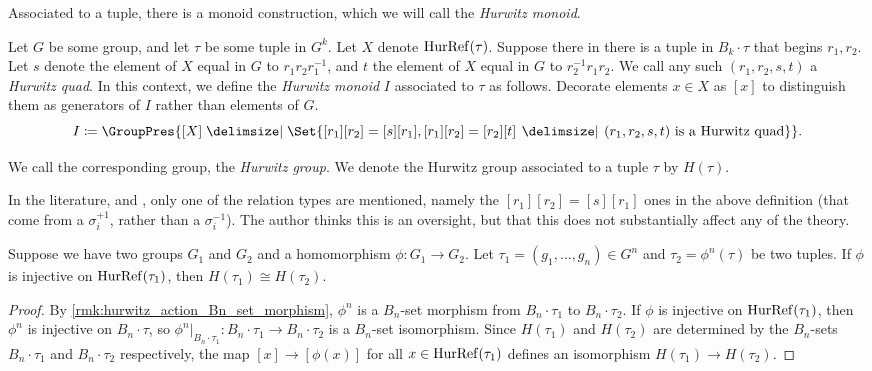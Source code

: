 Associated to a tuple, there is a monoid construction, which we will call the \emph{Hurwitz monoid}.
\begin{definition}
	Let $G$ be some group, and let $\tau$ be some tuple  in $G^k$.
	Let $X$ denote  $\operatorname{HurRef}(\tau)$.
	Suppose there in there is a tuple in  $B_k \cdot \tau$ that begins $r_1,r_2$.
	Let $s$ denote the element of $X$ equal in $G$ to  $r_1r_2r_1^{-1}$, and $t$ the element of  $X$ equal in  $G$ to  $r_2^{-1}r_1r_2$.
	We call any such $(r_1,r_2,s,t)$ a \emph{Hurwitz quad}.
	In this context, we define the \emph{Hurwitz monoid} $I$ associated to $\tau$ as follows.
	Decorate elements $x \in X$ as $[x]$ to distinguish them as generators of $I$ rather than elements of $G$.
	\[
		I \coloneq \GroupPres{[X] \relations \Set{ [r_1][r_2] = [s][r_1],  [r_1][r_2] = [r_2][t] \given (r_1,r_2,s,t) \text{ is a Hurwitz quad}}}
		.\]
\end{definition}
We call the corresponding group, the \emph{Hurwitz group}.
We denote the Hurwitz group associated to a tuple $\tau$ by  $H(\tau)$.
\begin{remark}
	In the literature, \cite[Lemma 7.11]{bessis_topology_2004} and \cite[Proposition 3.5]{mccammond_dual_2015}, only one of the relation types are mentioned, namely the $[r_1][r_2] = [s][r_1]$ ones in the above definition (that come from a $\sigma_i^{+1}$, rather than a  $\sigma_i^{-1}$).
	The author thinks this is an oversight, but that this does not substantially affect any of the theory.
\end{remark}
\begin{lemma}
	\label{lem:inj_on_hurref_implies_iso_hurwitz_group}
	Suppose we have two groups $G_1$ and $G_2$ and a homomorphism $\phi \colon G_1 \to G_2$.
	Let $\tau_1 = (g_1,\ldots,g_n) \in G^n$ and $\tau_2 = \phi^n(\tau)$ be two tuples.
	If $\phi$ is injective on $\operatorname{HurRef}(\tau_1)$, then  $H(\tau_1) \cong H(\tau_2)$.
\end{lemma}
\begin{proof}
	By \cref{rmk:hurwitz_action_Bn_set_morphism}, $\phi^n$ is a $B_n$-set morphism from  $B_n \cdot \tau_1$ to $B_n \cdot \tau_2$.
	If $\phi$ is injective on $\operatorname{HurRef}(\tau_1)$, then $\phi^n$ is injective on  $B_n \cdot \tau$, so  $\phi^n|_{B_n\cdot \tau_1} \colon B_n \cdot \tau_1 \to B_n \cdot \tau_2$ is a  $B_n$-set isomorphism.
	Since $H(\tau_1)$ and  $H(\tau_2)$ are determined by the  $B_n$-sets  $B_n \cdot \tau_1$ and $B_n \cdot \tau_2$ respectively, the map $[x] \to [\phi(x)]$ for all $x \in \operatorname{HurRef}(\tau_1)$ defines an isomorphism  $H(\tau_1) \to H(\tau_2)$.
\end{proof}

